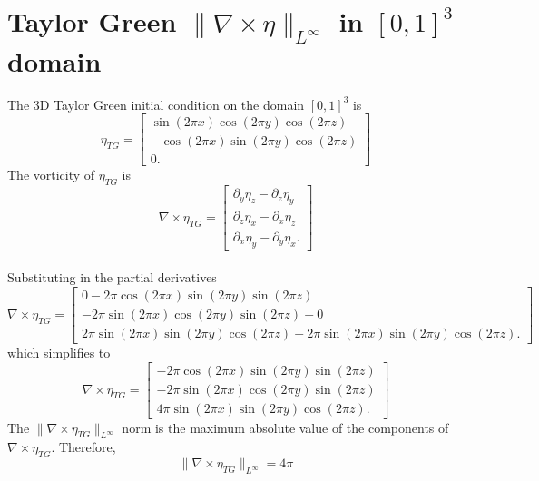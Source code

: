 \chapter{Taylor Green $\|\nabla\times\eta\|_{L^\infty}$ in $[0,1]^3$ domain}
\label{app:tg:vorticity:1}

The 3D Taylor Green initial condition on the domain $[0,1]^3$ is
$$\eta_{TG} = \begin{bmatrix}
           \sin(2\pi x)\cos(2\pi y)\cos(2\pi z) \\
           -\cos(2\pi x)\sin(2\pi y)\cos(2\pi z) \\
           0.
         \end{bmatrix}$$
The vorticity of $\eta_{TG}$ is
$$\nabla \times \eta_{TG} = \begin{bmatrix}
           \partial_y\eta_z - \partial_z\eta_y \\
           \partial_z\eta_x - \partial_x\eta_z \\
           \partial_x\eta_y - \partial_y\eta_x.
         \end{bmatrix}$$
\\
Substituting in the partial derivatives
\\
$$\nabla \times \eta_{TG} = \begin{bmatrix}
           0 - 2\pi \cos(2\pi x)\sin(2\pi y)\sin(2\pi z) \\
           -2\pi\sin(2\pi x)\cos(2\pi y)\sin(2\pi z) - 0\\
           2\pi\sin(2\pi x)\sin(2\pi y)\cos(2\pi z) + 2\pi\sin(2\pi x)\sin(2\pi y)\cos(2\pi z).
         \end{bmatrix}$$
which simplifies to 
$$\nabla \times \eta_{TG} = \begin{bmatrix}
           -2\pi \cos(2\pi x)\sin(2\pi y)\sin(2\pi z) \\
           -2\pi\sin(2\pi x)\cos(2\pi y)\sin(2\pi z)\\
           4\pi\sin(2\pi x)\sin(2\pi y)\cos(2\pi z).
         \end{bmatrix}$$
The $\|\nabla \times \eta_{TG}\|_{L^{\infty}}$ norm is the maximum absolute value of the components of $\nabla \times \eta_{TG}$. Therefore,
$$\|\nabla \times \eta_{TG}\|_{L^{\infty}} = 4\pi$$